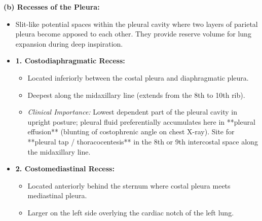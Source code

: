 \documentclass[11pt,a4paper]{article}
\begin{document}
\begin{ansbox}
\textbf{(b) Recesses of the Pleura:}
\begin{itemize}[leftmargin=*]
    \item Slit-like potential spaces within the pleural cavity where two layers of parietal pleura become apposed to each other. They provide reserve volume for lung expansion during deep inspiration.
    \item \textbf{1. Costodiaphragmatic Recess:}
    \begin{itemize}
        \item Located inferiorly between the costal pleura and diaphragmatic pleura.
        \item Deepest along the midaxillary line (extends from the 8th to 10th rib).
        \item \textit{Clinical Importance:} Lowest dependent part of the pleural cavity in upright posture; pleural fluid preferentially accumulates here in **pleural effusion** (blunting of costophrenic angle on chest X-ray). Site for **pleural tap / thoracocentesis** in the 8th or 9th intercostal space along the midaxillary line.
    \end{itemize}
    \item \textbf{2. Costomediastinal Recess:}
    \begin{itemize}
        \item Located anteriorly behind the sternum where costal pleura meets mediastinal pleura.
        \item Larger on the left side overlying the cardiac notch of the left lung.
    \end{itemize}
\end{itemize}


\end{ansbox}
\end{document}
